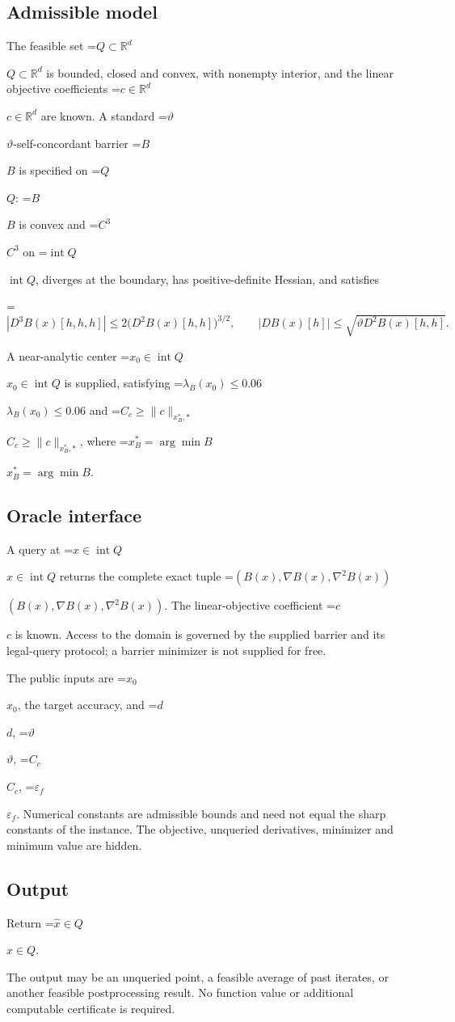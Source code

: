 \documentclass[10pt,a4paper]{article}
\newcommand{\AtlasMath}[1]{\par\begingroup\centering\setbox0=\hbox{$\displaystyle #1$}\ifdim\wd0>1.4\linewidth\typeout{ATLAS WIDE FORMULA: \the\wd0}\fi\ifdim\wd0>\linewidth\resizebox{\linewidth}{!}{\box0}\else\box0\fi\par\endgroup}
\newcommand{\AtlasInlineMath}[1]{\begingroup\setbox0=\hbox{$#1$}\ifdim\wd0>.4\linewidth\endgroup\AtlasMath{#1}\else\endgroup$#1$\fi}
\begin{document}
\subsection{Admissible model}
The feasible set \AtlasInlineMath{Q\subset\mathbb{R}^d} is bounded, closed and convex, with nonempty interior, and the linear objective coefficients \AtlasInlineMath{c\in\mathbb{R}^d} are known. A standard \AtlasInlineMath{\vartheta}-self-concordant barrier \AtlasInlineMath{B} is specified on \AtlasInlineMath{Q}: \AtlasInlineMath{B} is convex and \AtlasInlineMath{C^3} on \AtlasInlineMath{\operatorname{int}Q}, diverges at the boundary, has positive-definite Hessian, and satisfies


\AtlasMath{|D^3B(x)[h,h,h]|\le2\bigl(D^2B(x)[h,h]\bigr)^{3/2},\qquad|DB(x)[h]|\le\sqrt{\vartheta D^2B(x)[h,h]}.}


A near-analytic center \AtlasInlineMath{x_0\in\operatorname{int}Q} is supplied, satisfying \AtlasInlineMath{\lambda_B(x_0)\le0.06} and \AtlasInlineMath{C_c\ge\|c\|_{x_B^*,*}}, where \AtlasInlineMath{x_B^*=\arg\min B}.

\subsection{Oracle interface}
A query at \AtlasInlineMath{x\in\operatorname{int}Q} returns the complete exact tuple \AtlasInlineMath{(B(x),\nabla B(x),\nabla^2B(x))}. The linear-objective coefficient \AtlasInlineMath{c} is known. Access to the domain is governed by the supplied barrier and its legal-query protocol; a barrier minimizer is not supplied for free.

The public inputs are \AtlasInlineMath{x_0}, the target accuracy, and \AtlasInlineMath{d}, \AtlasInlineMath{\vartheta}, \AtlasInlineMath{C_c}, \AtlasInlineMath{\varepsilon_f}. Numerical constants are admissible bounds and need not equal the sharp constants of the instance. The objective, unqueried derivatives, minimizer and minimum value are hidden.

\subsection{Output}
Return \AtlasInlineMath{\widehat{x}\in Q}.

The output may be an unqueried point, a feasible average of past iterates, or another feasible postprocessing result. No function value or additional computable certificate is required.
\end{document}
